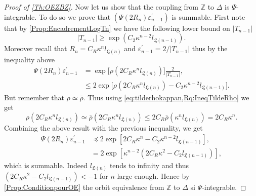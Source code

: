 \documentclass[english, 11pt, a4paper]{article}
\theoremstyle{definition}
\numberwithin{equation}{section}
\newcommand{\bZ}{\mathbb{Z}}
\newcommand{\BZ}{\Delta}
\newcommand{\epsZ}{\varepsilon^\prime}
\newcommand{\Landing}{\mathfrak{L}}
\newcommand{\rhoaff}{\bar{\rho}}
\begin{document}
\begin{proof}[Proof of \cref{Th:OEZBZ}]
  Now let us show that the coupling from $\bZ$ to $\BZ$ is
  $\Psi$-integrable. To do so we prove that
  $\left(\Psi(2R_n)\epsZ_{n-1}  \right)$ is summable.
  First note that by \cref{Prop:EncadrementLogTn} we have the following lower bound on $|T_{n-1}|$
  \begin{equation}\label{eq:MinorationTnmoinsun}
    |T_{n-1}| \geq \exp\left(C_2 \kappa^{n-2} l_{\Landing(n-1)} \right).
  \end{equation}
  Moreover recall that $R_n=C_R \kappa^nl_{\Landing(n)}$ and $\epsZ_{n-1}=2/|T_{n-1}|$
  thus by the inequality above
  \begin{align*}
    \Psi(2R_n)\epsZ_{n-1}
    &=\exp\Big[ \rho(2C_R\kappa^nl_{\Landing(n)}) \Big] \frac{2}{|T_{n-1}|},\\
    &\leq 2 \exp 
      \Big[\rho \left(2C_R\kappa^nl_{\Landing(n)}\right)- C_2\kappa^{n-2}l_{\Landing(n-1)}\Big].
  \end{align*}
  But remember that $\rho\simeq \rhoaff$. Thus using
  \cref{eq:tilderhokappan,Rq:IneqTildeRho} we get 
  \begin{equation} \label{eq:jaipasdidee}
    \rho \left(2C_R\kappa^nl_{\Landing(n)}\right)
    \simeq \rhoaff \left(2C_R\kappa^nl_{\Landing(n)}\right)
    \leq 2C_R \rhoaff \left(\kappa^nl_{\Landing(n)}\right) = 2C_R \kappa^n.
  \end{equation}
  Combining the above result with the previous inequality, we get
  \begin{align*}
    \Psi(2R_n)\epsZ_{n-1}
      & \preccurlyeq 2 \exp\left[2C_R\kappa^n-C_2\kappa^{n-2}l_{\Landing(n-1)} \right],\\
      & = 2 \exp\left[\kappa^{n-2}\left(2C_R\kappa^2-C_2l_{\Landing(n-1)}\right)\right],
  \end{align*}
  which is
  summable. Indeed $l_{\Landing(n)}$ tends to infinity and thus
  $\left(2C_R\kappa^2-C_2l_{\Landing(n-1)}\right)<-1$ for $n$ large enough. Hence by
  \cref{Prop:ConditionpourOE} the orbit equivalence from $\bZ$ to $\BZ$ si $\Psi$-integrable.


\end{proof}
\end{document}
